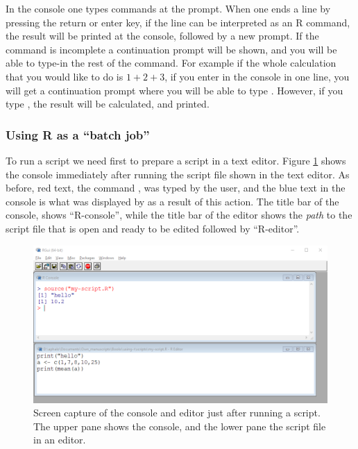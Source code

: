 \documentclass[krantz2]{krantz}\usepackage{knitr}%
\begin{document}
\begin{explainbox}
In the console one types commands at the \code{>} prompt. When one ends a line by pressing the return or enter key, if the line can be interpreted as an R command, the result will be printed at the console, followed by a new \code{>} prompt.
If the command is incomplete a \code{+} continuation prompt will be shown, and you will be able to type-in the rest of the command. For example if the whole calculation that you would like to do is $1 + 2 + 3$, if you enter in the console  in one line, you will get a continuation prompt where you will be able to type . However, if you type , the result will be calculated, and printed.
\end{explainbox}

\subsubsection{Using R as a ``batch job''}

To run a script we need first to prepare a script in a text editor. Figure \ref{fig:intro:script} shows the console immediately after running the script file shown in the text editor. As before, red text, the command , was typed by the user, and the blue text in the console is what was displayed by \Rpgrm as a result of this action. The title bar of the console, shows ``R-console'', while the title bar of the editor shows the \emph{path} to the script file that is open and ready to be edited followed by ``R-editor''.

\begin{figure}
  \centering
  \includegraphics[width=\linewidth]{figures/R-console-script}
  \caption[Script sourced at the R console]{Screen capture of the \Rpgrm console and editor just after running a script. The upper pane shows the \Rpgrm console, and the lower pane the script file in an editor. }\label{fig:intro:script}
\end{figure}
\end{document}
